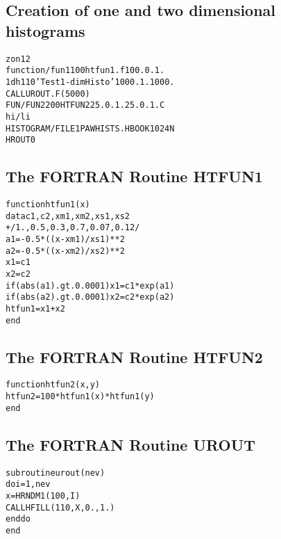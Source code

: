 \subsection*{Creation of one and two dimensional histograms}
\begin{alltt}
      zon 1 2
      function/fun1 100 htfun1.f 100. 0. 1.
      1dh  110 'Test 1-dim Histo' 100 0. 1. 1000.
     CALL UROUT.F(5000)
     FUN/FUN2 200 HTFUN2 25. 0. 1. 25. 0. 1. C
      hi/li
   HISTOGRAM/FILE 1 PAWHISTS.HBOOK 1024 N
     HROUT 0
\end{alltt}
\begin{minipage}[t]{8.9cm}
\subsection*{The FORTRAN Routine HTFUN1}
\begin{alltt}
      function htfun1(x)
      data c1,c2,xm1,xm2,xs1,xs2
     +/1.,0.5,0.3,0.7,0.07,0.12/
      a1=-0.5*((x-xm1)/xs1)**2
      a2=-0.5*((x-xm2)/xs2)**2
      x1=c1
      x2=c2
      if(abs(a1).gt.0.0001)x1=c1*exp(a1)
      if(abs(a2).gt.0.0001)x2=c2*exp(a2)
      htfun1=x1+x2
      end
\end{alltt}
\end{minipage}
\begin{minipage}[t]{8.9cm}
\subsection*{The FORTRAN Routine HTFUN2}
\begin{alltt}
     function htfun2(x,y)
      htfun2=100*htfun1(x)*htfun1(y)
      end
\end{alltt}
\subsection*{The FORTRAN Routine UROUT}
\begin{alltt}
      subroutine urout(nev)
      do i=1,nev
        x=HRNDM1(100,I)
        CALL HFILL(110,X,0.,1.)
      enddo
      end
\end{alltt}
\end{minipage}

